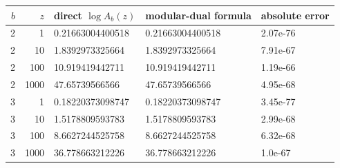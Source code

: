 \begin{tabular}{@{}rrlll@{}}
\toprule
$b$ & $z$ & direct $\log A_b(z)$ & modular-dual formula & absolute error \\
\midrule
2 & 1 & 0.21663004400518 & 0.21663004400518 & 2.07e-76 \\
2 & 10 & 1.8392973325664 & 1.8392973325664 & 7.91e-67 \\
2 & 100 & 10.919419442711 & 10.919419442711 & 1.19e-66 \\
2 & 1000 & 47.65739566566 & 47.65739566566 & 4.95e-68 \\
3 & 1 & 0.18220373098747 & 0.18220373098747 & 3.45e-77 \\
3 & 10 & 1.5178809593783 & 1.5178809593783 & 2.99e-68 \\
3 & 100 & 8.6627244525758 & 8.6627244525758 & 6.32e-68 \\
3 & 1000 & 36.778663212226 & 36.778663212226 & 1.0e-67 \\
\bottomrule
\end{tabular}
